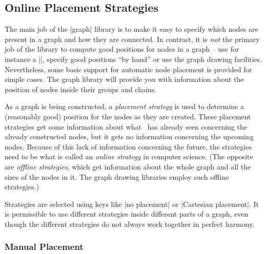 \subsection{Online Placement Strategies}
\label{section-library-graphs-placement}

The main job of the |graph| library is to make it easy to specify which nodes
are present in a graph and how they are connected. In contrast, it is
\emph{not} the primary job of the library to compute good positions for nodes
in a graph -- use for instance a |\matrix|, specify good positions ``by hand''
or use the graph drawing facilities. Nevertheless, some basic support for
automatic node placement is provided for simple cases. The graph library will
provide you with information about the position of nodes inside their groups
and chains.

As a graph is being constructed, a \emph{placement strategy} is used to
determine a (reasonably good) position for the nodes as they are created. These
placement strategies get some information about what \tikzname\ has already
seen concerning the already constructed nodes, but it gets no information
concerning the upcoming nodes. Because of this lack of information concerning
the future, the strategies need to be what is called an \emph{online strategy}
in computer science. (The opposite are \emph{offline strategies}, which get
information about the whole graph and all the sizes of the nodes in it. The
graph drawing libraries employ such offline strategies.)

Strategies are selected using keys like |no placement| or
|Cartesian placement|. It is permissible to use different strategies inside
different parts of a graph, even though the different strategies do not always
work together in perfect harmony.


\subsubsection{Manual Placement}
\label{section-graphs-xy}


